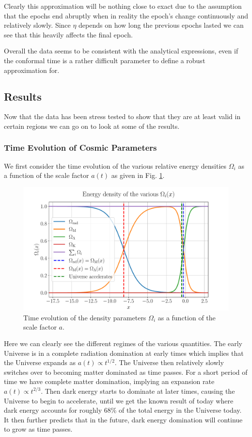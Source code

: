 \documentclass[%
reprint,
 amsmath,amssymb,
 aps,
]{revtex4-2}
\begin{document}
Clearly this approximation will be nothing close to exact due to the assumption that the epochs end abruptly when in reality the epoch's change continuously and relatively slowly. Since $\eta$ depends on how long the previous epochs lasted we can see that this heavily affects the final epoch. 

Overall the data seems to be consistent with the analytical expressions, even if the conformal time is a rather difficult parameter to define a robust approximation for.

\subsection{Results}

Now that the data has been stress tested to show that they are at least valid in certain regions we can go on to look at some of the results.
\subsubsection{Time Evolution of  Cosmic Parameters}
We first consider the time evolution of the various relative energy densities $\Omega_i$ as a function of the scale factor $a(t)$ as given in Fig. \ref{fig:Omegai}.
\begin{figure}[ht!]
	\includegraphics[width = \linewidth]{Figures/Omega_i.pdf}
	\caption{Time evolution of the density parameters $\Omega_i$ as a function of the scale factor $a$.}
	\label{fig:Omegai}
\end{figure}

Here we can clearly see the different regimes of the various quantities. The early Universe is in a complete radiation domination at early times which implies that the Universe expands as $a(t)\propto t^{1/2}$. The Universe then relatively slowly switches over to becoming matter dominated as time passes. For a short period of time we have complete matter domination, implying an expansion rate $a(t)\propto t^{2/3}$. Then dark energy starts to dominate at later times, causing the Universe to begin to accelerate, until we get the known result of today where dark energy accounts for roughly 68\% of the total energy in the Universe today. It then further predicts that in the future, dark energy domination will continue to grow as time passes.
\end{document}
